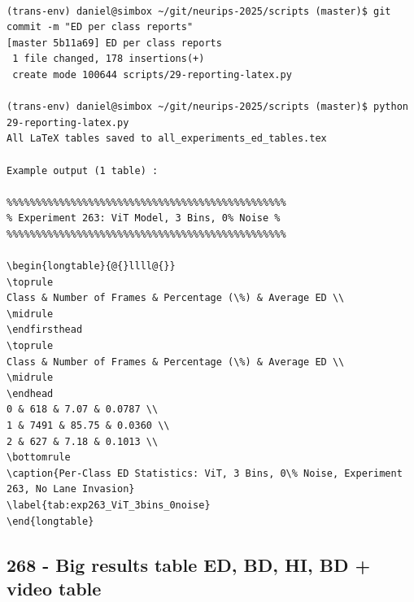 \begin{verbatim}

(trans-env) daniel@simbox ~/git/neurips-2025/scripts (master)$ git commit -m "ED per class reports"
[master 5b11a69] ED per class reports
 1 file changed, 178 insertions(+)
 create mode 100644 scripts/29-reporting-latex.py
 
(trans-env) daniel@simbox ~/git/neurips-2025/scripts (master)$ python 29-reporting-latex.py 
All LaTeX tables saved to all_experiments_ed_tables.tex

Example output (1 table) :

%%%%%%%%%%%%%%%%%%%%%%%%%%%%%%%%%%%%%%%%%%%%%%%%
% Experiment 263: ViT Model, 3 Bins, 0% Noise %
%%%%%%%%%%%%%%%%%%%%%%%%%%%%%%%%%%%%%%%%%%%%%%%%

\begin{longtable}{@{}llll@{}}
\toprule
Class & Number of Frames & Percentage (\%) & Average ED \\
\midrule
\endfirsthead
\toprule
Class & Number of Frames & Percentage (\%) & Average ED \\
\midrule
\endhead
0 & 618 & 7.07 & 0.0787 \\
1 & 7491 & 85.75 & 0.0360 \\
2 & 627 & 7.18 & 0.1013 \\
\bottomrule
\caption{Per-Class ED Statistics: ViT, 3 Bins, 0\% Noise, Experiment 263, No Lane Invasion}
\label{tab:exp263_ViT_3bins_0noise}
\end{longtable}

\end{verbatim}

\subsection{268 - Big results table ED, BD, HI, BD + video table}
\label{app_res:268}

